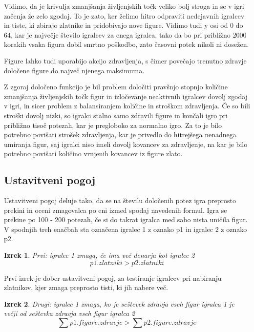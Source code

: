 \documentclass[a4paper, 12pt]{book}
\newtheorem{izrek}{Izrek}[chapter]
\begin{document}
Vidimo, da je krivulja zmanjšanja življenjskih točk veliko bolj stroga in se v igri začenja že zelo zgodaj. 
To je zato, ker želimo hitro odpraviti nedejavnih igralcev in  tiste, ki zbirajo zlatnike in pridobivajo nove figure.
Vidimo tudi y osi od 0 do 64, kar je največje število igralcev za enega igralca, tako da bo pri približno 2000 korakih vsaka figura dobil smrtno poškodbo, zato časovni potek nikoli ni dosežen.

Figure lahko tudi uporabijo akcijo zdravljenja, s čimer povečajo trenutno zdravje določene figure do največ njenega maksimuma.
	
Z zgoraj določeno funkcijo je bil problem določiti pravšnjo stopnjo količine zmanjšanja življenjskih točk figur in izločevanje neaktivnih igralcev dovolj zgodaj v igri, in sicer problem z balansiranjem količine in stroškom zdravljenja. 
Če so bili stroški dovolj nizki, so igralci stalno samo zdravili figure in končali igro pri približno tisoč potezah, kar je pregloboko za normalno igro.
Za to je bilo potrebno povišati strošek zdravljenja, kar je privedlo do hitrejšega nenadnega umiranja figur, saj igralci niso imeli dovolj kovancev za zdravljenje, na kar je bilo potrebno povišati količino vrnjenih kovancev iz figure zlato.

\subsection{Ustavitveni pogoj}
Ustavitveni pogoj deluje tako, da se na številu določenih potez igra preprosto prekini in oceni zmagovalca po eni izmed spodaj navedenih formul.
Igra se prekine po 100 - 200 potezah, če si do takrat igralca med sabo nista uničila figur.
V spodnjih treh  enačbah sta označena igralec 1 z oznako p1 in igralec 2 z oznako p2.

\begin{izrek}
	\label{ustavitvenipogoj1}
Prvi: igralec 1 zmaga, če ima več denarja kot igralec 2
	\begin{equation}
p1.zlatniki > p2.zlatniki
	\label{eq:ustavitvenipogoj1}
	\end{equation}
\end{izrek}

Prvi izrek je dober ustavitveni pogoj, za testiranje igralcev pri nabiranju zlatnikov, kjer zmaga preprosto tisti, ki jih nabere več.

\begin{izrek}
	\label{ustavitvenipogoj2}
Drugi: igralec 1 zmaga, ko je seštevek zdravja vseh figur igralca 1 je večji od seštevka zdravja vseh figur igralca 2
	\begin{equation}
	\sum{p1.figure.zdravje} > \sum{p2.figure.zdravje}
	\label{eq:ustavitvenipogoj2}
	\end{equation}
\end{izrek}
\end{document}
